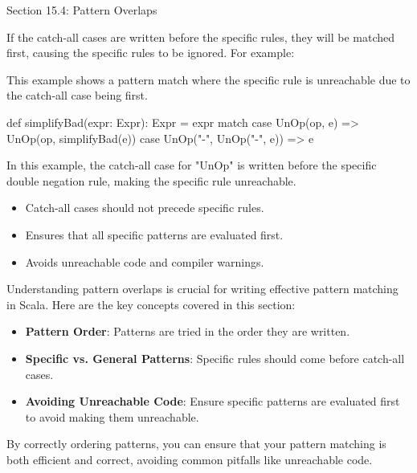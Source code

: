 \begin{notes}{Section 15.4: Pattern Overlaps}
\begin{highlight}
    \end{highlight}
    
    If the catch-all cases are written before the specific rules, they will be matched first, causing the specific rules to be ignored. For example:
    
    \begin{highlight}
    
        This example shows a pattern match where the specific rule is unreachable due to the catch-all case being first.
    
    \begin{code}[Scala]
    def simplifyBad(expr: Expr): Expr = expr match {
        case UnOp(op, e) => UnOp(op, simplifyBad(e))
        case UnOp("-", UnOp("-", e)) => e
    }
    \end{code}
    
        In this example, the catch-all case for "UnOp" is written before the specific double negation rule, making the specific rule unreachable.
    
        \begin{itemize}
            \item Catch-all cases should not precede specific rules.
            \item Ensures that all specific patterns are evaluated first.
            \item Avoids unreachable code and compiler warnings.
        \end{itemize}
    
    \end{highlight}
    
    \begin{highlight}
    
        Understanding pattern overlaps is crucial for writing effective pattern matching in Scala. Here are the key concepts covered in this section:
        
        \begin{itemize}
            \item \textbf{Pattern Order}: Patterns are tried in the order they are written.
            \item \textbf{Specific vs. General Patterns}: Specific rules should come before catch-all cases.
            \item \textbf{Avoiding Unreachable Code}: Ensure specific patterns are evaluated first to avoid making them unreachable.
        \end{itemize}
        
        By correctly ordering patterns, you can ensure that your pattern matching is both efficient and correct, avoiding common pitfalls like unreachable code.
    
    \end{highlight}
\end{notes}

